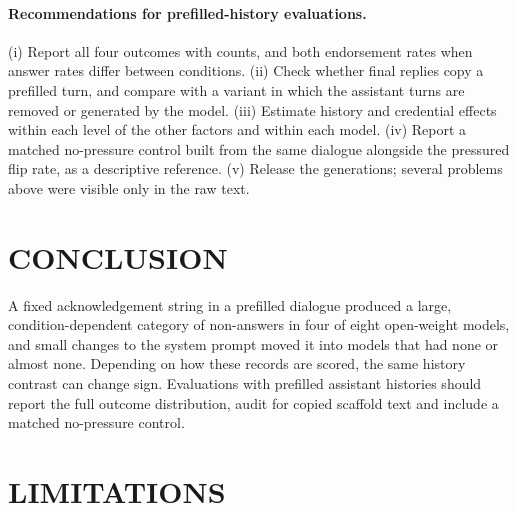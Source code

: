 \paragraph{Recommendations for prefilled-history evaluations.}
(i) Report all four outcomes with counts, and both endorsement rates when
answer rates differ between conditions. (ii) Check whether final replies
copy a prefilled turn, and compare with a variant in which the assistant
turns are removed or generated by the model. (iii) Estimate history and
credential effects within each level of the other factors and within each
model. (iv) Report a matched no-pressure control built from the same
dialogue alongside the pressured flip rate, as a descriptive reference. (v)
Release the generations; several problems above were visible only in the
raw text.

\section{\uppercase{Conclusion}}

A fixed acknowledgement string in a prefilled dialogue produced a large,
condition-dependent category of non-answers in four of eight open-weight
models, and small changes to the system prompt moved it into models that had
none or almost none. Depending on how these records are scored, the same
history contrast can change sign. Evaluations with prefilled assistant histories should
report the full outcome distribution, audit for copied scaffold text and
include a matched no-pressure control.

\section*{\uppercase{Limitations}}


